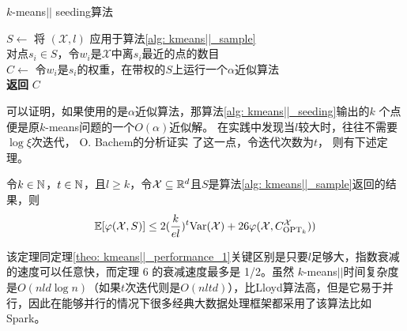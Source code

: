 \begin{algorithm}
    \caption{$k$-means\(\vert \vert\) seeding算法}\label{alg: kmeans||_seeding}
    $S \gets$ 将 $(\mathcal{X},l)$ 应用于算法\ref{alg: kmeans||_sample} \\
    对点$s_i \in S$，令$w_i$是$\mathcal{X}$中离$s_i$最近的点的数目 \\
    $C \gets$ 令$w_i$是$s_i$的权重，在带权的$S$上运行一个$\alpha$近似算法 \\
    \textbf{返回} $C$
\end{algorithm}
可以证明，如果使用的是$\alpha$近似算法，那算法\ref{alg: kmeans||_seeding}输出的$k$
个点便是原$k$-means问题的一个$O(\alpha)$近似解。 在实践中发现当$l$较大时，往往不需要$\log \xi$次迭代， O. Bachem\cite{bachem2017distributed}的分析证实
了这一点，令迭代次数为$t$， 则有下述定理。
\begin{theorem}
    令$k \in \mathbb{N}$，$t \in \mathbb{N}$，且$l \geq k$，令$\mathcal{X} \subseteq \mathbb{R}^d$且$S$是算法\ref{alg: kmeans||_sample}返回的结果，则
    \begin{equation*}
    \mathbb{E}[\varphi(\mathcal{X},S)] \leq 2(\frac{k}{el})^t \text{Var}(\mathcal{X}) + 26\varphi(\mathcal{X},C_{\text{OPT}_k}^{\mathcal{X}}))
    \end{equation*}
\end{theorem}
该定理同定理\ref{theo: kmeans||_performance_1}关键区别是只要$l$足够大，指数衰减的速度可以任意快，而定理 6 的衰减速度最多是 1/2。虽然 $k$-means\(\vert \vert\)时间复杂度是$O(nld \log n)$（如果$t$次迭代则是$O(nltd)$），比Lloyd算法高，但是它易于并行，因此在能够并行的情况下很多经典大数据处理框架都采用了该算法比如Spark。

